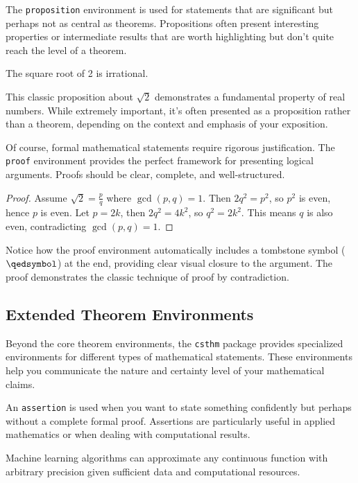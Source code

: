 \documentclass[9pt]{amsart}
\begin{document}
The \texttt{proposition} environment is used for statements that are
significant but perhaps not as central as theorems. Propositions often present
interesting properties or intermediate results that are worth highlighting but
don't quite reach the level of a theorem.

\begin{proposition}
	The square root of 2 is irrational.
\end{proposition}

This classic proposition about $\sqrt{2}$ demonstrates a fundamental property
of real numbers. While extremely important, it's often presented as a
proposition rather than a theorem, depending on the context and emphasis of
your exposition.

Of course, formal mathematical statements require rigorous justification. The
\texttt{proof} environment provides the perfect framework for presenting
logical arguments. Proofs should be clear, complete, and well-structured.

\begin{proof}
	Assume $\sqrt{2} = \frac{p}{q}$ where $\gcd(p,q) = 1$. Then $2q^2 = p^2$, so $p^2$ is even, hence $p$ is even. Let $p = 2k$, then $2q^2 = 4k^2$, so $q^2 = 2k^2$. This means $q$ is also even, contradicting $\gcd(p,q) = 1$.
\end{proof}

Notice how the proof environment automatically includes a tombstone symbol
($\qedsymbol$) at the end, providing clear visual closure to the argument. The
proof demonstrates the classic technique of proof by contradiction.

\subsection{Extended Theorem Environments}

Beyond the core theorem environments, the \texttt{csthm} package provides
specialized environments for different types of mathematical statements. These
environments help you communicate the nature and certainty level of your
mathematical claims.

An \texttt{assertion} is used when you want to state something confidently but
perhaps without a complete formal proof. Assertions are particularly useful in
applied mathematics or when dealing with computational results.

\begin{assertion}
	Machine learning algorithms can approximate any continuous function with arbitrary precision given sufficient data and computational resources.
\end{assertion}
\end{document}
